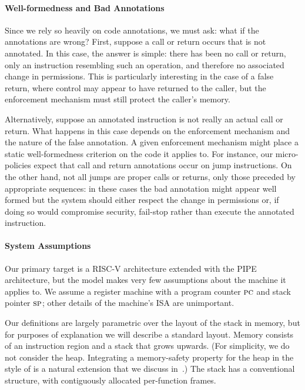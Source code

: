 \documentclass[acmsmall,review,anonymous]{acmart}\settopmatter{printfolios=true,printccs=false,printacmref=false}
\begin{document}
\paragraph*{Well-formedness and Bad Annotations}

Since we rely so heavily on code annotations, we must ask: what if the annotations
are wrong? First, suppose a call or return occurs that is not annotated.
In this case, the answer is simple:
there has been no call or return, only an instruction resembling such an operation, and
therefore no associated change in permissions. This is particularly interesting in the
case of a false return, where control may appear to have returned to the caller, but
the enforcement mechanism must still protect the caller's memory.

Alternatively, suppose an annotated instruction is not really an actual call or return.
What happens in this case depends on the enforcement mechanism and the nature of the false
annotation. A given enforcement mechanism might place a static well-formedness criterion
on the code it applies to. For instance, our
micro-policies expect that call and return
annotations occur on jump instructions. On the other hand, not all jumps are proper
calls or returns, only those preceded by appropriate sequences: in these cases the
bad annotation might appear well formed but the system should either respect the change
in permissions or, if doing so would compromise security, fail-stop rather than
execute the annotated instruction.

\paragraph*{System Assumptions}


Our primary target is a RISC-V architecture extended with the PIPE architecture, but the
model makes very few assumptions about the machine it applies to. We assume a register
machine with a program counter \(\textsc{pc}\) and stack pointer \(\textsc{sp}\); other details of
the machine's ISA are unimportant.

Our definitions are largely parametric over the layout of the stack in memory, but for
purposes of explanation we will describe a standard layout. Memory consists of an
instruction region and a stack that grows upwards.
(For simplicity,
we do not consider the heap. Integrating a memory-safety property for the
heap in the style of \citet{DBLP:conf/post/AmorimHP18} is a natural extension
that we discuss in~.) The stack has a conventional structure, with
contiguously allocated per-function frames.
\end{document}
